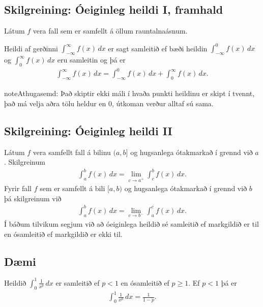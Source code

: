 \documentclass[a4paper,10pt,icelandic]{sphinxmanual}
\begin{document}
\subsection{Skilgreining: Óeiginleg heildi I, framhald}
\label{kafli06:skilgreining-oeiginleg-heildi-i-framhald}
Látum \(f\) vera fall sem er samfellt á öllum rauntalnaásnum.

Heildi af gerðinni \(\int_{-\infty}^\infty f(x)\,dx\) er sagt
samleitið ef bæði heildin \(\int_{-\infty}^0 f(x)\,dx\) og
\(\int_0^\infty f(x)\,dx\) eru samleitin og þá er
\begin{equation*}
\begin{split}\int_{-\infty}^\infty f(x)\,dx=\int_{-\infty}^0 f(x)\,dx +
  \int_0^\infty f(x)\,dx.\end{split}
\end{equation*}
\begin{notice}{note}{Athugasemd:}
Það skiptir ekki máli í hvaða punkti heildinu er skipt í tvennt, það má
velja aðra tölu heldur en 0, útkoman verður alltaf sú sama.
\end{notice}


\subsection{Skilgreining: Óeiginleg heildi II}
\label{kafli06:skilgreining-oeiginleg-heildi-ii}
Látum \(f\) vera samfellt fall á bilinu \((a, b]\) og hugsanlega
ótakmarkað í grennd við \(a\). Skilgreinum
\begin{equation*}
\begin{split}\int_a^b f(x)\,dx=\lim_{c\rightarrow a^+} \int_c^b f(x)\,dx.\end{split}
\end{equation*}
Fyrir fall \(f\) sem er samfellt á bili \([a, b)\) og hugsanlega
ótakmarkað í grennd við \(b\) þá skilgreinum við
\begin{equation*}
\begin{split}\int_a^b f(x)\,dx=\lim_{c\rightarrow b^-} \int_a^c f(x)\,dx.\end{split}
\end{equation*}
Í báðum tilvikum segjum við að óeiginlega heildið sé samleitið ef
markgildið er til en ósamleitið ef markgildið er ekki til.


\subsection{Dæmi}
\label{kafli06:id9}
Heildið \(\int_0^1 \frac{1}{x^p}\,dx\) er samleitið ef \(p<1\)
en ósamleitið ef \(p\geq 1\). Ef \(p<1\) þá er
\begin{equation*}
\begin{split}\int_0^1
\frac{1}{x^p}\,dx=\frac{1}{1-p}.\end{split}
\end{equation*}
\end{document}
